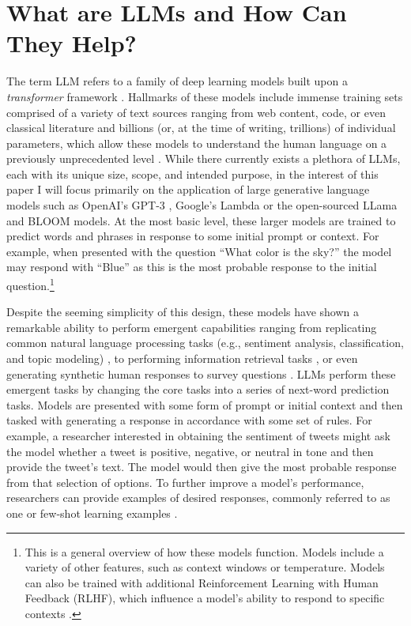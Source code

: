     \section{What are LLMs and How Can They Help?}
    The term LLM refers to a family of deep learning models built upon a \textit{transformer} framework \citep{vaswaniAttentionAllYou2017}. Hallmarks of these models include immense training sets comprised of a variety of text sources ranging from web content, code, or even classical literature and billions (or, at the time of writing, trillions) of individual parameters, which allow these models to understand the human language on a previously unprecedented level \citep{adiwardanaHumanlikeOpenDomainChatbot2020,brownLanguageModelsAre2020,radfordLanguageModelsAre2019}. While there currently exists a plethora of LLMs, each with its unique size, scope, and intended purpose, in the interest of this paper I will focus primarily on the application of large generative language models such as OpenAI’s GPT-3 \citep{brownLanguageModelsAre2020}, Google’s Lambda \citep{thoppilanLaMDALanguageModels2022} or the open-sourced LLama \citep{touvronLLaMAOpenEfficient2023} and BLOOM \citep{scaoBLOOM176BParameterOpenAccess2023} models. At the most basic level, these larger models are trained to predict words and phrases in response to some initial prompt or context. For example, when presented with the question “What color is the sky?” the model may respond with “Blue” as this is the most probable response to the initial question.\footnote{This is a general overview of how these models function. Models include a variety of other features, such as context windows or temperature. Models can also be trained with additional Reinforcement Learning with Human Feedback (RLHF), which influence a model's ability to respond to specific contexts \citep{ouyangTrainingLanguageModels2022}.}

    Despite the seeming simplicity of this design, these models have shown a remarkable ability to perform emergent capabilities ranging from replicating common natural language processing tasks (e.g., sentiment analysis, classification, and topic modeling) \citep{brownLanguageModelsAre2020,ornsteinHowTrainYour}, to performing information retrieval tasks \citep{zhouFrequencybasedDistortionsContextualized2021}, or even generating synthetic human responses to survey questions \citep{argyleOutOneMany2023}. LLMs perform these emergent tasks by changing the core tasks into a series of next-word prediction tasks. Models are presented with some form of prompt or initial context and then tasked with generating a response in accordance with some set of rules. For example, a researcher interested in obtaining the sentiment of tweets might ask the model whether a tweet is positive, negative, or neutral in tone and then provide the tweet's text. The model would then give the most probable response from that selection of options. To further improve a model's performance, researchers can provide examples of desired responses, commonly referred to as one or few-shot learning examples \citep{lazaridouInternetaugmentedLanguageModels2022}.

